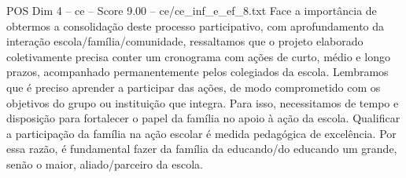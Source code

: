 \begin{textsample}{POS Dim 4 – ce – Score 9.00 – ce/ce\_inf\_e\_ef\_8.txt}
Face a importância de obtermos a consolidação deste processo participativo, com aprofundamento da interação escola/família/comunidade, ressaltamos que o projeto elaborado coletivamente precisa conter um cronograma com ações de curto, médio e longo prazos, acompanhado permanentemente pelos colegiados da escola.
Lembramos que é preciso aprender a participar das ações, de modo comprometido com os objetivos do grupo ou instituição que integra.
Para isso, necessitamos de tempo e disposição para fortalecer o papel da família no apoio à ação da escola.
Qualificar a participação da família na ação escolar é medida pedagógica de excelência.
Por essa razão, é fundamental fazer da família da educando/do educando um grande, senão o maior, aliado/parceiro da escola.

\end{textsample}
